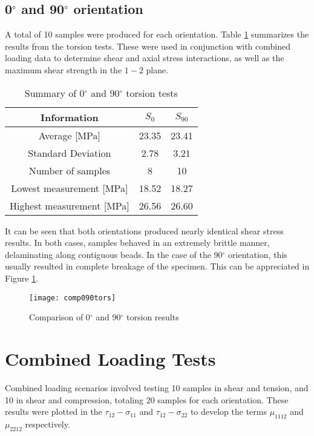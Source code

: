 \documentclass[main.tex]{subfiles}
\begin{document}
\subsection{0$^\circ$ and 90$^\circ$ orientation} \label{ssec:090r}

A total of 10 samples were produced for each orientation. Table \ref{tab:tors090r} summarizes the results from the torsion tests. These were used in conjunction with combined loading data to determine shear and axial stress interactions, as well as the maximum shear strength in the $1-2$ plane.

\begin{table} [h]
	\centering
	\caption{Summary of 0$^\circ$ and 90$^\circ$ torsion tests}
\begin{tabular}{ c| c c } 
	\toprule
	\textbf{Information} & $S_{0}$ & $S_{90}$\\
	\midrule
	Average [MPa] &23.35  & 23.41\\
	Standard Deviation &2.78 & 3.21\\
	Number of samples &8  & 10\\
	Lowest measurement [MPa] &18.52  & 18.27\\
	Highest measurement [MPa] &26.56 & 26.60\\
	\bottomrule
\end{tabular}
\label{tab:tors090r}
\end{table}


It can be seen that both orientations produced nearly identical shear stress results. In both cases, samples behaved in an extremely brittle manner, delaminating along contiguous beads. In the case of the 90$^\circ$ orientation, this usually resulted in complete breakage of the specimen. This can be appreciated in Figure \ref{fig:090comptors}.

\begin{figure}[!htbp]
	\center
	\texttt{[image: comp090tors]}
	\caption{Comparison of 0$^\circ$ and 90$^\circ$ torsion results} \label{fig:090comptors}
\end{figure}
   
\section{Combined Loading Tests} \label{sec:clr}

Combined loading scenarios involved testing 10 samples in shear and tension, and 10 in shear and compression, totaling 20 samples for each orientation. These results were plotted in the $\tau_{12}-\sigma_{11}$ and $\tau_{12}-\sigma_{22}$ to develop the terms $\mu_{1112}$ and $\mu_{2212}$ respectively. 
 
\end{document}
